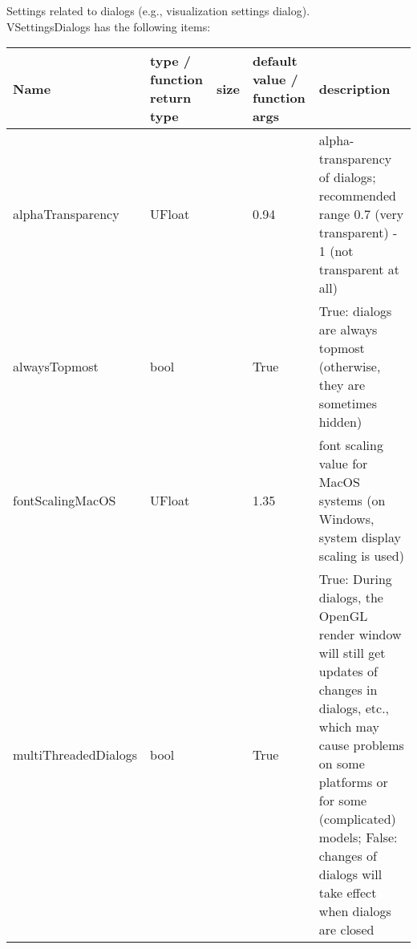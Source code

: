  \label{sec:VSettingsDialogs}
Settings related to dialogs (e.g., visualization settings dialog).\\ 
%
VSettingsDialogs has the following items:
\begin{center}
  \footnotesize
  \begin{longtable}{| p{4.2cm} | p{2.5cm} | p{0.3cm} | p{3.0cm} | p{6cm} |}
    \hline
    \bf Name & \bf type / function return type & \bf size & \bf default value / function args & \bf description \\ \hline
    alphaTransparency &     UFloat &      &     0.94 &     alpha-transparency of dialogs; recommended range 0.7 (very transparent) - 1 (not transparent at all)\\ \hline
    alwaysTopmost &     bool &      &     True &     True: dialogs are always topmost (otherwise, they are sometimes hidden)\\ \hline
    fontScalingMacOS &     UFloat &      &     1.35 &     font scaling value for MacOS systems (on Windows, system display scaling is used)\\ \hline
    multiThreadedDialogs &     bool &      &     True &     True: During dialogs, the OpenGL render window will still get updates of changes in dialogs, etc., which may cause problems on some platforms or for some (complicated) models; False: changes of dialogs will take effect when dialogs are closed\\ \hline
	  \end{longtable}
	\end{center}

